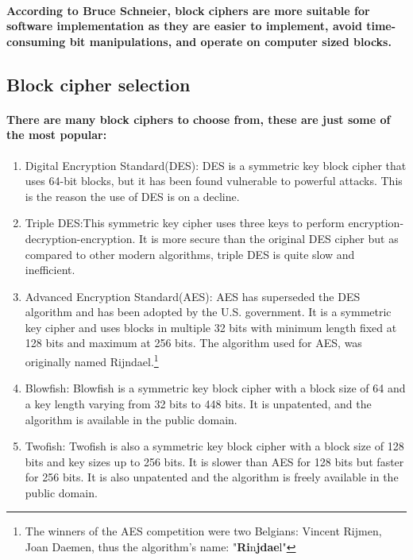 \paragraph{According to Bruce Schneier, block ciphers are more suitable for software implementation as they are easier to implement, avoid time-consuming bit manipulations, and operate on computer sized blocks.}\cite[p. 172]{book2}

\subsection{Block cipher selection}
\paragraph{There are many block ciphers to choose from, these are just some of the most popular:}\cite{book3}
\begin{enumerate}
\item Digital Encryption Standard(DES): DES is a symmetric key block cipher that uses 64-bit blocks, but it has been found vulnerable to powerful attacks. This is the reason the use of DES is on a decline. 
\item Triple DES:This symmetric key cipher uses three keys to perform encryption-decryption-encryption. It is more secure than the original DES cipher but as compared to other modern algorithms, triple DES is quite slow and inefficient. 
\item Advanced Encryption Standard(AES): AES has superseded the DES algorithm and has been adopted by the U.S. government. It is a symmetric key cipher and uses blocks in multiple 32 bits with minimum length fixed at 128 bits and maximum at 256 bits. The algorithm used for AES, was originally named Rijndael.\footnote{The winners of the AES competition were two Belgians: Vincent Rijmen, Joan Daemen, thus the algorithm's name: "\textbf{Ri}n\textbf{jdae}l"}
\item Blowfish: Blowfish is a symmetric key block cipher with a block size of 64 and a key length varying from 32 bits to 448 bits. It is unpatented, and the algorithm is available in the public domain. 
\item Twofish: Twofish is also a symmetric key block cipher with a block size of 128 bits and key sizes up to 256 bits. It is slower than AES for 128 bits but faster for 256 bits. It is also unpatented and the algorithm is freely available in the public domain.
\end{enumerate}

